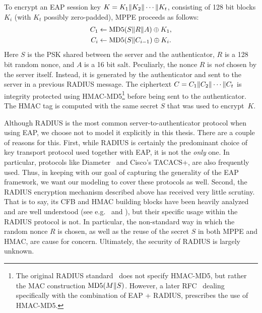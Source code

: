 To encrypt an EAP session key $K = K_1 \| K_2 \| \dotsb \| K_t$,
consisting of 128 bit blocks $K_i$ (with $K_t$ possibly zero-padded),
MPPE proceeds as follows:
\begin{align}\label{eq:EAP:MPPE}
	C_1 &\gets \operatorname{MD5}(S \| R \| A) \oplus K_1 , \\
	C_i &\gets \operatorname{MD5}(S \| C_{i-1}) \oplus K_i .
\end{align} 
Here $S$ is the PSK shared between the server and the authenticator, 
$R$ is a 128 bit random nonce,
and $A$ is a 16 bit salt.
Peculiarly,
the nonce $R$ is \emph{not} chosen by the server itself.
Instead, it is generated by the authenticator and sent to the server in a previous RADIUS message.
The ciphertext $C = C_1 \| C_2 \| \dotsb \| C_t$ is integrity protected using HMAC-MD5\footnote{The original RADIUS standard~\cite{IETF:RFC2865:RADIUS} does not specify HMAC-MD5,
but rather the MAC construction $\operatorname{MD5}(M \| S)$. 
However, a later RFC~\cite{IETF:RFC3579:RADIUS+EAP} dealing specifically with the combination of EAP + RADIUS,
prescribes the use of HMAC-MD5.
} 
before being sent to the authenticator.
The HMAC tag is computed with the same secret $S$ that was used to encrypt~$K$. 


Although RADIUS is the most common server-to-authenticator protocol when using EAP,
we choose not to model it explicitly in this thesis.
There are a couple of reasons for this.
First,
while RADIUS is certainly the predominant choice of key transport protocol used together with EAP,
it is not the \emph{only} one.
In particular,
protocols like Diameter~\cite{IETF:RFC6733:DIAMETER} and Cisco's TACACS+\cite{IETF:DRAFT:TACACS+},
are also frequently used.
Thus,
in keeping with our  goal of capturing the generality of the EAP framework,
we want our modeling to cover these protocols as well.
Second,
the RADIUS encryption mechanism described above has received very little scrutiny. 
That is to say,
its CFB and HMAC building blocks have been heavily analyzed and are well understood
(see e.g.~\cite{EPRINT:Wooding08} and \cite{JC:Bellare15}),
but their specific usage within the RADIUS protocol is not.
In particular,
the non-standard way in which the random nonce $R$ is chosen,
as well as the reuse of the secret $S$ in both MPPE and HMAC,
are cause for concern.
Ultimately,
the security of RADIUS is largely unknown.

